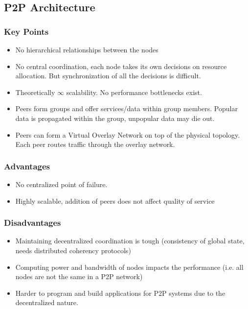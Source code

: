 \documentclass{article}
\begin{document}
\subsection{P2P Architecture}
\subsubsection{Key Points}
\begin{itemize}
    \item No hierarchical relationships between the nodes
    
    \item No central coordination, each node takes its own decisions on resource allocation. But synchronization of all the decisions is difficult.
    
    \item Theoretically $\infty$ scalability. No performance bottlenecks exist.
    
    \item Peers form groups and offer services/data within group members. Popular data is propagated within the group, unpopular data may die out. 
    
    \item Peers can form a Virtual Overlay Network on top of the physical topology. Each peer routes traffic through the overlay network.
\end{itemize}

\subsubsection{Advantages}
\begin{itemize}
    \item No centralized point of failure. 
    
    \item Highly scalable, addition of peers does not affect quality of service
\end{itemize}

\subsubsection{Disadvantages}
\begin{itemize}
    \item Maintaining decentralized coordination is tough (consistency of global state, needs distributed coherency protocols)
    
    \item Computing power and bandwidth of nodes impacts the performance (i.e. all nodes are not the same in a P2P network)
    
    \item Harder to program and build applications for P2P systems due to the decentralized nature.
\end{itemize}
\end{document}
